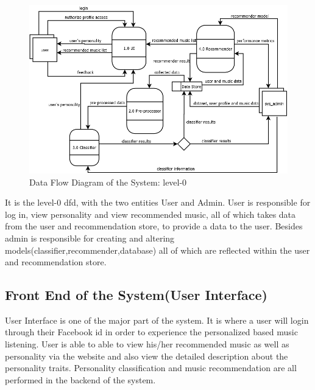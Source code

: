 \begin{figure}[!ht]
\centering
\includegraphics[width = 16 cm]{fig/new/dfd.png}
\caption{Data Flow Diagram of the System: level-0}
\label{fig:dfd}
\end{figure}

It is the level-0 dfd, with the two entities User and Admin. User is responsible for log in, view personality and view recommended music, all of which takes data from the user and recommendation store, to provide a data to the user. Besides admin is responsible for creating and altering models(classifier,recommender,database) all of which are reflected within the user and recommendation store.

\subsection{Front End of the System(User Interface)}
User Interface is one of the major part of the system. It is where a user will login through their Facebook id in order to experience the personalized based music listening. User is able to able to view his/her recommended music as well as personality via the website and also view the detailed description about the personality traits. Personality classification and music recommendation are all performed in the backend of the system.


